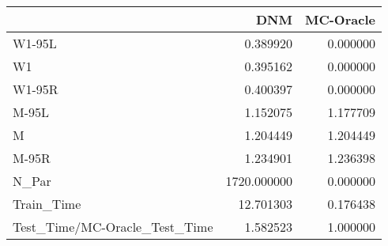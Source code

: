 \begin{tabular}{lrr}
\toprule
{} &          DNM &  MC-Oracle \\
\midrule
W1-95L                        &     0.389920 &   0.000000 \\
W1                            &     0.395162 &   0.000000 \\
W1-95R                        &     0.400397 &   0.000000 \\
M-95L                         &     1.152075 &   1.177709 \\
M                             &     1.204449 &   1.204449 \\
M-95R                         &     1.234901 &   1.236398 \\
N\_Par                         &  1720.000000 &   0.000000 \\
Train\_Time                    &    12.701303 &   0.176438 \\
Test\_Time/MC-Oracle\_Test\_Time &     1.582523 &   1.000000 \\
\bottomrule
\end{tabular}
